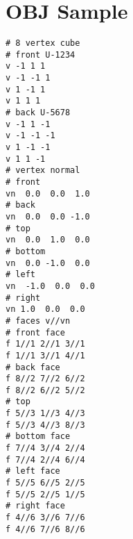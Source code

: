 \chapter{OBJ Sample}
\label{appendix-obj-sample}

\begin{lstlisting}[language=Obj]
# 8 vertex cube
# front U-1234
v -1 1 1
v -1 -1 1
v 1 -1 1
v 1 1 1
# back U-5678
v -1 1 -1
v -1 -1 -1
v 1 -1 -1
v 1 1 -1
# vertex normal
# front
vn  0.0  0.0  1.0
# back
vn  0.0  0.0 -1.0
# top
vn  0.0  1.0  0.0
# bottom
vn  0.0 -1.0  0.0
# left
vn  -1.0  0.0  0.0
# right
vn 1.0  0.0  0.0
# faces v//vn
# front face
f 1//1 2//1 3//1
f 1//1 3//1 4//1
# back face
f 8//2 7//2 6//2
f 8//2 6//2 5//2
# top
f 5//3 1//3 4//3
f 5//3 4//3 8//3
# bottom face
f 7//4 3//4 2//4
f 7//4 2//4 6//4
# left face
f 5//5 6//5 2//5
f 5//5 2//5 1//5
# right face
f 4//6 3//6 7//6
f 4//6 7//6 8//6
\end{lstlisting}

